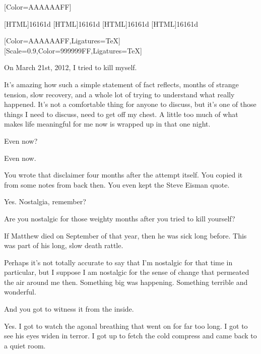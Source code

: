 \renewfontfamily{}[Color=AAAAAAFF]

[HTML]{16161d}
[HTML]{16161d}
[HTML]{16161d}
[HTML]{16161d}
\begin{paracol}{2}
\begin{leftcolumn}

[Color=AAAAAAFF,Ligatures=TeX]
\renewfontfamily{}[Scale=0.9,Color=999999FF,Ligatures=TeX]

\noindent On March 21st, 2012, I tried to kill myself.

It's amazing how such a simple statement of fact reflects, months of strange tension, slow recovery, and a whole lot of trying to understand what really happened. It's not a comfortable thing for anyone to discuss, but it's one of those things I need to discuss, need to get off my chest. A little too much of what makes life meaningful for me now is wrapped up in that one night.

\begin{ally}
Even now?
\end{ally}
Even now.

\begin{ally}
You wrote that disclaimer four months after the attempt itself. You copied it from some notes from back then. You even kept the Steve Eisman quote.
\end{ally}
Yes. Nostalgia, remember?

\begin{ally}
Are you nostalgic for those weighty months after you tried to kill yourself?
\end{ally}
If Matthew died on September of that year, then he was sick long before. This was part of his long, slow death rattle.

Perhaps it's not totally accurate to say that I'm nostalgic for that time in particular, but I suppose I am nostalgic for the sense of change that permeated the air around me then. Something big was happening. Something terrible and wonderful.

\begin{ally}
And you got to witness it from the inside.
\end{ally}
Yes. I got to watch the agonal breathing that went on for far too long. I got to see his eyes widen in terror. I got up to fetch the cold compress and came back to a quiet room.


\end{leftcolumn}
\end{paracol}
